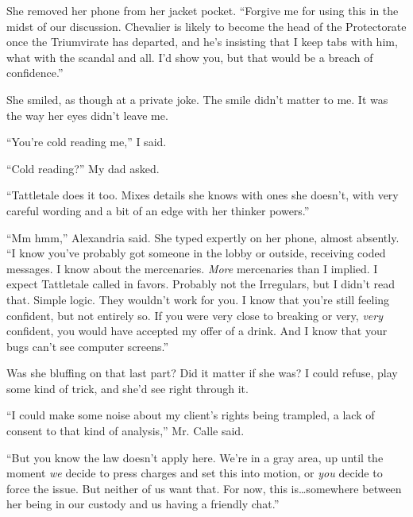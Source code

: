 She removed her phone from her jacket pocket.  ``Forgive me for using this in the midst of our discussion.  Chevalier is likely to become the head of the Protectorate once the Triumvirate has departed, and he's insisting that I keep tabs with him, what with the scandal and all.  I'd show you, but that would be a breach of confidence.''



She smiled, as though at a private joke.  The smile didn't matter to me.  It was the way her eyes didn't leave me.



``You're cold reading me,'' I said.



``Cold reading?'' My dad asked.



``Tattletale does it too.  Mixes details she knows with ones she doesn't, with very careful wording and a bit of an edge with her thinker powers.''



``Mm hmm,'' Alexandria said.  She typed expertly on her phone, almost absently.  ``I know you've probably got someone in the lobby or outside, receiving coded messages.  I know about the mercenaries.  \emph{More }mercenaries than I implied.  I expect Tattletale called in favors.  Probably not the Irregulars, but I didn't read that.  Simple logic.  They wouldn't work for you.  I know that you're still feeling confident, but not entirely so.  If you were very close to breaking or very, \emph{very} confident, you would have accepted my offer of a drink.  And I know that your bugs can't see computer screens.''



Was she bluffing on that last part?  Did it matter if she was?  I could refuse, play some kind of trick, and she'd see right through it.



``I could make some noise about my client's rights being trampled, a lack of consent to that kind of analysis,'' Mr. Calle said.



``But you know the law doesn't apply here.  We're in a gray area, up until the moment \emph{we} decide to press charges and set this into motion, or \emph{you} decide to force the issue.  But neither of us want that.  For now, this is\ldots somewhere between her being in our custody and us having a friendly chat.''



